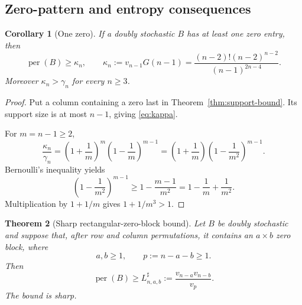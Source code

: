 \documentclass[11pt]{article}
\newtheorem{theorem}{Theorem}[section]
\newtheorem{corollary}[theorem]{Corollary}
\theoremstyle{definition}
\newcommand{\per}{\operatorname{per}}
\newcommand{\1}{\mathbf{1}}
\begin{document}
\subsection{Zero-pattern and entropy consequences}

\begin{corollary}[One zero]\label{cor:one-zero}
If a doubly stochastic $B$ has at least one zero entry, then
\[
 \per(B)\ge\kappa_n,
 \qquad
 \kappa_n:=v_{n-1}G(n-1)
 =\frac{(n-2)!(n-2)^{n-2}}{(n-1)^{2n-4}}.
 \tag{3.6}\label{eq:kappa}
\]
Moreover $\kappa_n>\gamma_n$ for every $n\ge3$.
\end{corollary}

\begin{proof}
Put a column containing a zero last in Theorem~\ref{thm:support-bound}.  Its support size is at most $n-1$, giving \eqref{eq:kappa}.

For $m=n-1\ge2$,
\[
 \frac{\kappa_n}{\gamma_n}
 =\left(1+\frac1m\right)^m
  \left(1-\frac1m\right)^{m-1}
 =\left(1+\frac1m\right)
  \left(1-\frac1{m^2}\right)^{m-1}.
\]
Bernoulli's inequality yields
\[
 \left(1-\frac1{m^2}\right)^{m-1}
 \ge1-\frac{m-1}{m^2}
 =1-\frac1m+\frac1{m^2}.
\]
Multiplication by $1+1/m$ gives $1+1/m^3>1$.
\end{proof}

\begin{theorem}[Sharp rectangular-zero-block bound]\label{thm:rectangular}
Let $B$ be doubly stochastic and suppose that, after row and column permutations, it contains an $a\times b$ zero block, where
\[
 a,b\ge1,
 \qquad
 p:=n-a-b\ge1.
\]
Then
\[
 \per(B)\ge
 L^{\sharp}_{n,a,b}:=
 \frac{v_{n-a}v_{n-b}}{v_p}.
 \tag{3.7}\label{eq:sharp-block}
\]
The bound is sharp.
\end{theorem}
\end{document}
